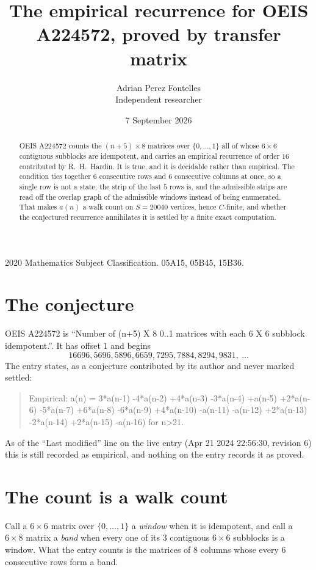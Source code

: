 \documentclass[11pt,a4paper]{article}
\title{The empirical recurrence for OEIS A224572, proved by transfer matrix}
\author{Adrian Perez Fontelles\\ \small Independent researcher}
\date{7 September 2026}
\theoremstyle{plain}
\theoremstyle{definition}
\begin{document}
\maketitle

\begin{abstract}
OEIS A224572 counts the $(n+5)\times8$ matrices over $\{0,\dots,1\}$ all of whose
$6\times6$ contiguous subblocks are idempotent, and carries an empirical recurrence of order
$16$ contributed by R.~H.~Hardin. It is true, and it is decidable rather than empirical.
The condition ties together $6$ consecutive rows and $6$ consecutive columns at once, so a
single row is not a state; the strip of the last $5$ rows is, and the admissible strips
are read off the overlap graph of the admissible windows instead of being enumerated. That
makes $a(n)$ a walk count on $S=20040$ vertices, hence $C$-finite, and whether the conjectured
recurrence annihilates it is settled by a finite exact computation.
\end{abstract}

\noindent\small 2020 Mathematics Subject Classification. 05A15, 05B45, 15B36.\normalsize

\section{The conjecture}

OEIS A224572 is ``Number of (n+5) X 8 0..1 matrices with each 6 X 6 subblock idempotent.''. It has offset $1$ and begins
\[
16696, 5696, 5896, 6659, 7295, 7884, 8294, 9831,\ \dots
\]
The entry states, as a conjecture contributed by its author and never marked settled:
\begin{quote}
Empirical: a(n) = 3*a(n-1) -4*a(n-2) +4*a(n-3) -3*a(n-4) +a(n-5) +2*a(n-6) -5*a(n-7) +6*a(n-8) -6*a(n-9) +4*a(n-10) -a(n-11) -a(n-12) +2*a(n-13) -2*a(n-14) +2*a(n-15) -a(n-16) for n>21.
\end{quote}
As of the ``Last modified'' line on the live entry (Apr 21 2024 22:56:30, revision 6) this is still
recorded as empirical, and nothing on the entry records it as proved.

\section{The count is a walk count}

Call a $6\times6$ matrix over $\{0,\dots,1\}$ a \emph{window} when it is idempotent, and
call a $6\times8$ matrix a \emph{band} when every one of its $3$ contiguous
$6\times6$ subblocks is a window. What the entry counts is the matrices of $8$ columns
whose every $6$ consecutive rows form a band.
\end{document}
